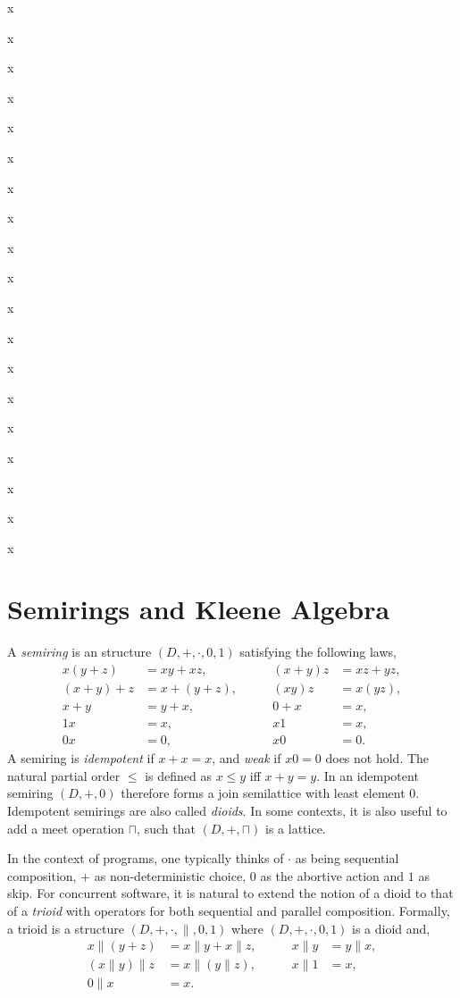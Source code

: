 \documentclass{llncs}
\begin{document}
x

x

x

x

x

x

x

x

x

x

x

x

x

x

x

x

x

x

x

\newpage
\section{Semirings and Kleene Algebra}
\label{sec:KA}

A \emph{semiring} is an structure
$(D,+,\cdot,0,1)$ satisfying the following laws,
\begin{align*}
  x(y + z) &= xy + xz, &\qquad (x + y)z &= xz + yz,\\
  (x + y) + z &= x + (y + z), &\qquad (xy)z &= x(yz),\\
  x + y &= y + x, &\qquad 0 + x &= x,\\
  1x &= x, &\qquad x1 &= x,\\
  0x &= 0, &\qquad x0 &= 0.
\end{align*}
A semiring is \emph{idempotent} if $x + x = x$, and \emph{weak} if $x0
= 0$ does not hold. The natural partial order $\le$ is defined as $x
\le y $ iff $x + y = y$. In an idempotent semiring $(D,+,0)$ therefore
forms a join semilattice with least element $0$. Idempotent semirings
are also called \emph{dioids}. In some contexts, it is also useful to
add a meet operation $\sqcap$, such that $(D,+,\sqcap)$ is a lattice.

In the context of programs, one typically thinks of $\cdot$ as being
sequential composition, $+$ as non-deterministic choice, $0$ as the
abortive action and $1$ as skip. For concurrent software, it is
natural to extend the notion of a dioid to that of a \emph{trioid}
with operators for both sequential and parallel composition. Formally,
a trioid is a structure $(D,+,\cdot,\|,0,1)$ where $(D,+,\cdot,0,1)$
is a dioid and,
\begin{align*}
  x\|(y + z) &= x\|y + x\|z, &\qquad x\|y &= y\|x,\\
  (x\|y)\|z &= x\|(y\|z), &\qquad x\|1 &= x,\\
  0\|x &= x.
\end{align*}
\end{document}
